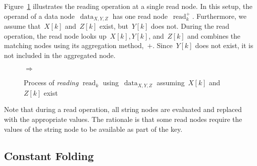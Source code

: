 \documentclass{article}
\DeclareMathOperator{\readNode}{read}
\DeclareMathOperator{\dataNode}{data}
\begin{document}
Figure~\ref{fig:modification:reading} illustrates the reading operation at a single read node.
In this setup, the operand of a data node~$\dataNode_{X,Y,Z}$ has one read node~$\readNode_k^+$.
Furthermore, we assume that~$X[k]$ and~$Z[k]$ exist, but~$Y[k]$ does not.
During the read operation, the read node looks up~$X[k], Y[k]$, and~$Z[k]$ and combines the matching nodes using its aggregation method,~$+$.
Since~$Y[k]$ does not exist, it is not included in the aggregated node.
%
\begin{figure}
	\centering
	\quad$\Rightarrow$\quad
	\caption{Process of \emph{reading} $\readNode_k$ using~$\dataNode_{X, Y, Z}$ assuming~$X[k]$ and~$Z[k]$ exist}
	\label{fig:modification:reading}
\end{figure}

Note that during a read operation, all string nodes are evaluated and replaced with the appropriate values.
The rationale is that some read nodes require the values of the string node to be available as part of the key.

\subsection{Constant Folding}
\end{document}
